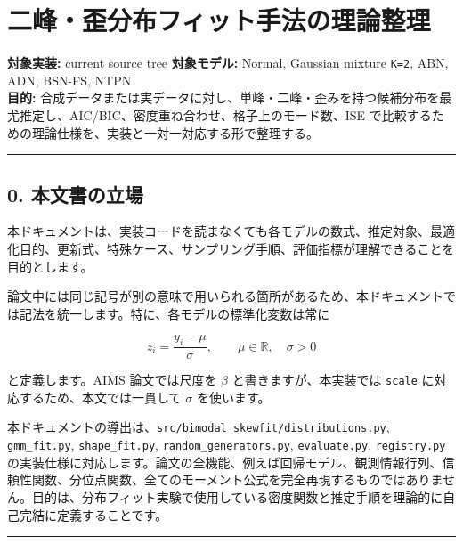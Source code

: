 \documentclass[
]{article}
\author{}
\date{}
\begin{document}
{
\setcounter{tocdepth}{3}
\tableofcontents
}
\hypertarget{ux4e8cux5cf0ux6b6aux5206ux5e03ux30d5ux30a3ux30c3ux30c8ux624bux6cd5ux306eux7406ux8ad6ux6574ux7406}{%
\section{二峰・歪分布フィット手法の理論整理}\label{ux4e8cux5cf0ux6b6aux5206ux5e03ux30d5ux30a3ux30c3ux30c8ux624bux6cd5ux306eux7406ux8ad6ux6574ux7406}}

\textbf{対象実装:} current source tree \textbf{対象モデル:} Normal,
Gaussian mixture \texttt{K=2}, ABN, ADN, BSN-FS, NTPN\\
\textbf{目的:}
合成データまたは実データに対し、単峰・二峰・歪みを持つ候補分布を最尤推定し、AIC/BIC、密度重ね合わせ、格子上のモード数、ISE
で比較するための理論仕様を、実装と一対一対応する形で整理する。

\begin{center}\rule{0.5\linewidth}{0.5pt}\end{center}

\hypertarget{ux672cux6587ux66f8ux306eux7acbux5834}{%
\subsection{0.
本文書の立場}\label{ux672cux6587ux66f8ux306eux7acbux5834}}

本ドキュメントは、実装コードを読まなくても各モデルの数式、推定対象、最適化目的、更新式、特殊ケース、サンプリング手順、評価指標が理解できることを目的とします。

論文中には同じ記号が別の意味で用いられる箇所があるため、本ドキュメントでは記法を統一します。特に、各モデルの標準化変数は常に

\[
z_i = \frac{y_i - \mu}{\sigma}, \qquad \mu \in \mathbb{R}, \quad \sigma > 0
\]

と定義します。AIMS 論文では尺度を \(\beta\) と書きますが、本実装では
\texttt{scale} に対応するため、本文では一貫して \(\sigma\) を使います。

本ドキュメントの導出は、\texttt{src/bimodal\_skewfit/distributions.py},
\texttt{gmm\_fit.py}, \texttt{shape\_fit.py},
\texttt{random\_generators.py}, \texttt{evaluate.py},
\texttt{registry.py}
の実装仕様に対応します。論文の全機能、例えば回帰モデル、観測情報行列、信頼性関数、分位点関数、全てのモーメント公式を完全再現するものではありません。目的は、分布フィット実験で使用している密度関数と推定手順を理論的に自己完結に定義することです。

\begin{center}\rule{0.5\linewidth}{0.5pt}\end{center}
\end{document}
